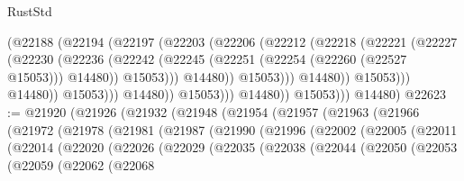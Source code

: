 \begin{lexlean}{RustStd}
\begin{coremodule}
                                      (@22188
                                        (@22194
                                          (@22197
                                            (@22203
                                              (@22206
                                                (@22212
                                                  (@22218
                                                    (@22221
                                                      (@22227
                                                        (@22230
                                                          (@22236
                                                            (@22242
                                                              (@22245
                                                                (@22251
                                                                  (@22254 (@22260 (@22527 @15053)))
                                                                  @14480))
                                                              @15053)))
                                                        @14480))
                                                    @15053)))
                                              @14480))
                                          @15053)))
                                    @14480))
                                @15053)))
                          @14480))
                      @15053)))
                @14480))
            @15053)))
      @14480)
@22623 := @21920
    (@21926
      (@21932
        (@21948
          (@21954
            (@21957
              (@21963
                (@21966
                  (@21972
                    (@21978
                      (@21981
                        (@21987
                          (@21990
                            (@21996
                              (@22002
                                (@22005
                                  (@22011
                                    (@22014
                                      (@22020
                                        (@22026
                                          (@22029
                                            (@22035
                                              (@22038
                                                (@22044
                                                  (@22050
                                                    (@22053
                                                      (@22059
                                                        (@22062
                                                          (@22068

\end{coremodule}
\end{lexlean}
